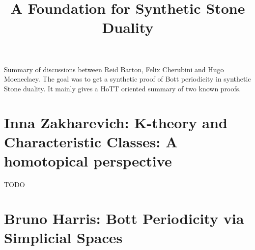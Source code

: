 \documentclass{../util/zariski}
\title{A Foundation for Synthetic Stone Duality}
\begin{document}
\author{}
\date{}

\maketitle

Summary of discussions between Reid Barton, Felix Cherubini and Hugo Moeneclaey. The goal was to get a synthetic proof of Bott periodicity in synthetic Stone duality. It mainly gives a HoTT oriented summary of two known proofs.

\section{Inna Zakharevich: K-theory and Characteristic Classes: A homotopical perspective}
TODO

\section{Bruno Harris: Bott Periodicity via Simplicial Spaces}


\printbibliography
\end{document}
